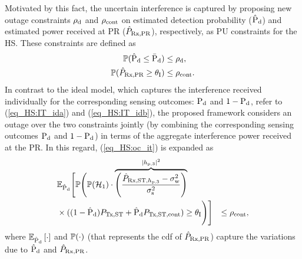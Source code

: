 Motivated by this fact, the uncertain interference is captured by proposing new outage constraints $\rho_{\text{d}}$ and $\rho_{\text{cont}}$ on estimated detection probability ($\hat{\text{P}}_{\text{d}}$) and estimated power received at PR ($\hat{P}_{\text{Rx,PR}}$), respectively, as PU constraints for the HS. These constraints are defined as  
\begin{align}
\mathbb P(\hat{\text{P}}_{\text{d}} \le \bar{\text{P}}_{\text{d}}) &\le \rho_{\text{d}} \label{eq_HS:oc_pd}, \\
\mathbb P(\hat{P}_{\text{Rx,PR}} \ge \theta_{\text{I}}) &\le \rho_{\text{cont}} \label{eq_HS:oc_it}.
\end{align}   
In contrast to the ideal model, which captures the interference received individually for the corresponding sensing outcomes: $\text{P}_{\text{d}}$ and  $1- \text{P}_{\text{d}}$, refer to (\ref{eq_HS:IT_ida}) and (\ref{eq_HS:IT_idb}), the proposed framework considers an outage over the two constraints jointly (by combining the corresponding sensing outcomes $\text{P}_{\text{d}}$ and $1 - \text{P}_{\text{d}}$) in terms of the aggregate interference power received at the PR. In this regard, (\ref{eq_HS:oc_it}) is expanded as 
\begin{align}
& \mathbb{E}_{\hat{\text{P}}_{\text{d}}} \Bigg[ \mathbb P \Bigg( \mathbb P(\mathcal{H}_1) \cdot \smash[b]{\overbrace{\left( \frac{\hat{P}_{\text{Rx,ST,$h_{\text{p,3}}$}} - \sigma^2_{\text{w}}}{\sigma^2_{\text{s}}} \right)}^{|h_{\text{p,3}}|^2}} \nonumber \\ & \times ((1 - \hat{\text{P}}_{\text{d}}) P_{\text{Tx,ST}} + \hat{\text{P}}_{\text{d}} P_{\text{Tx,ST,cont}}) \ge \theta_{\text{I}} \Bigg) \Bigg] &\le \rho_{\text{cont}} \label{eq_HS:oc_it_def}, 
\end{align}
where ${\mathbb E}_{\hat{\text{P}}_{\text{d}}}\left[ \cdot \right]$ and $\mathbb P(\cdot)$ (that represents the cdf of $\hat{P}_{\text{Rx,PR}}$) capture the variations due to $\hat{\text{P}}_{\text{d}}$ and $\hat{P}_{\text{Rx,PR}}$. 

